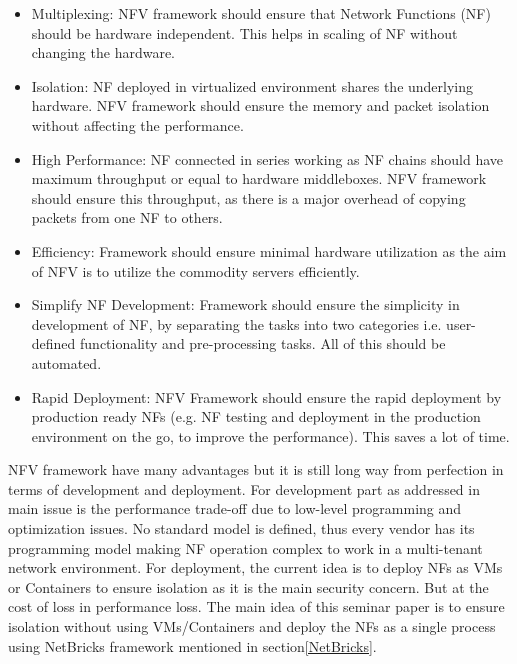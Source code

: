 \documentclass[10pt, a4paper, conference]{IEEEtran}
\begin{document}
\begin{itemize}
	\item Multiplexing: NFV framework should ensure that Network Functions (NF) should be hardware independent. This helps in scaling of NF without changing the hardware.
	\item Isolation: NF deployed in virtualized environment shares the underlying hardware. NFV framework should ensure the memory and packet isolation without affecting the performance. 
	\item High Performance: NF connected in series working as NF chains should have maximum throughput or equal to hardware middleboxes. NFV framework should ensure this throughput, as there is a major overhead of copying packets from one NF to others.
	\item Efficiency: Framework should ensure minimal hardware utilization as the aim of NFV is to utilize the commodity servers efficiently.
	\item Simplify NF Development: Framework should ensure the simplicity in development of NF, by separating the tasks into two categories i.e. user-defined functionality and pre-processing tasks. All of this should be automated. 
	\item Rapid Deployment: NFV Framework should ensure the rapid deployment by production ready NFs (e.g. NF testing and deployment in the production environment on the go, to improve the performance). This saves a lot of time.
\end{itemize}


NFV framework have many advantages but it is still long way from perfection in terms of development and deployment. For development part as addressed in \cite{Philippov2017} main issue is the performance trade-off due to low-level programming and optimization issues. No standard model is defined, thus every vendor has its programming model making NF operation complex to work in a multi-tenant network environment. For deployment, the current idea is to deploy NFs as VMs or Containers to ensure isolation as it is the main security concern. But at the cost of loss in performance loss. The main idea of this seminar paper is to ensure isolation without using VMs/Containers and deploy the NFs as a single process using NetBricks framework\cite{Panda2016} mentioned in section\ref{NetBricks}.
\end{document}
